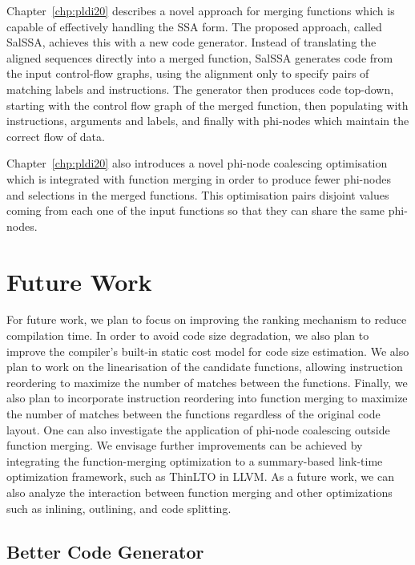 Chapter~\ref{chp:pldi20} describes a novel approach for merging functions which is capable of effectively handling the SSA form.
The proposed approach, called SalSSA, achieves this with a new code generator.
Instead of translating the aligned sequences directly into a merged function, SalSSA generates code from the input control-flow graphs, using the alignment only to specify pairs of matching labels and instructions.
The generator then produces code top-down, starting with the control flow graph of the merged function, then populating with instructions, arguments and labels, and finally with phi-nodes which maintain the correct flow of data.

Chapter~\ref{chp:pldi20} also introduces a novel phi-node coalescing optimisation which is integrated with function merging in order to produce fewer phi-nodes and selections in the merged functions.
This optimisation pairs disjoint values coming from each one of the input functions so that they can share the same phi-nodes.


\subsection{}


\section{Future Work} \label{sec:conclusion:futurework}

For future work, we plan to focus on improving the ranking mechanism to reduce compilation time.
In order to avoid code size degradation, we also plan to improve the compiler's built-in static cost model for code size estimation.
We also plan to work on the linearisation of the candidate functions, allowing instruction reordering to maximize the number of matches between the functions.
Finally, we also plan to incorporate instruction reordering into function merging to maximize the number of matches between the functions regardless of the original code layout.
One can also investigate the application of phi-node coalescing outside function merging.
We envisage further improvements can be achieved by integrating the function-merging optimization to a summary-based  link-time optimization framework, such as ThinLTO in LLVM.
As a future work, we can also analyze the interaction between function merging and other optimizations such as inlining, outlining, and code splitting.

\subsection{Better Code Generator}

